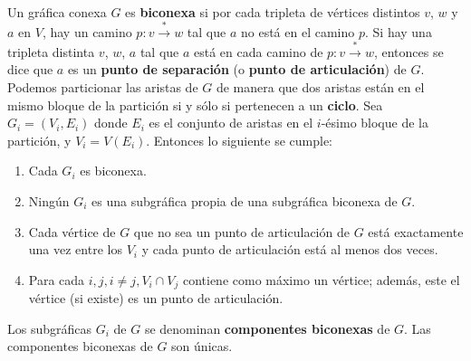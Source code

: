 \paragraph{}
Un gráfica conexa $G$ es \textbf{biconexa} si por cada tripleta de vértices distintos $v$, $w$ y $a$ en $V$, hay un camino $p: v \overset{\ast}{\rightarrow} w$ tal que $a$ no está en el camino $p$. Si hay una tripleta distinta $v$, $w$, $a$ tal que $a$ está en cada camino de  $p :v  \overset{\ast}{\rightarrow} w$, entonces se dice que  $a$ es un \textbf{punto de separación} (o  \textbf{punto de articulación}) de $G$. Podemos particionar las aristas de $G$ de manera que dos aristas están en el mismo bloque de la partición si y sólo si pertenecen a un \textbf{ciclo}. Sea $G_{i} =  \left(V_{i}, E_{i}\right)$ donde $E_{i}$ es el conjunto de aristas en el $i$-ésimo bloque de la partición, y $V_{i} = V\left(E_{i}\right)$. Entonces lo siguiente se cumple:
\begin{enumerate}
\item Cada $G_{i}$ es biconexa.
\item Ningún $G_{i}$ es una subgráfica propia de una subgráfica biconexa de $G$.
\item Cada vértice de $G$ que no sea un punto de articulación de $G$ está exactamente una vez entre los $V_{i}$ y cada punto de articulación está al menos dos veces.
\item Para cada $i, j, i \neq j, V_{i} \cap V_{j}$ contiene como máximo un vértice; además, este el vértice (si existe) es un punto de articulación.
\end{enumerate}
Los subgráficas $G_{i}$ de $G$ se denominan \textbf{componentes biconexas} de $G$. Las componentes biconexas de $G$ son únicas.

